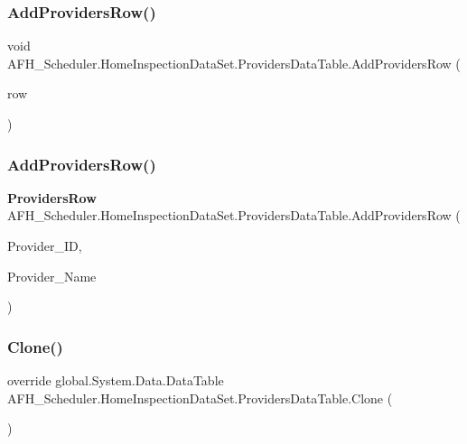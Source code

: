 \subsubsection{AddProvidersRow()\hspace{0.1cm}{\footnotesize\ttfamily [1/2]}}
{\footnotesize\ttfamily void A\+F\+H\+\_\+\+Scheduler.\+Home\+Inspection\+Data\+Set.\+Providers\+Data\+Table.\+Add\+Providers\+Row (\begin{DoxyParamCaption}\item[{\textbf{ Providers\+Row}}]{row }\end{DoxyParamCaption})}

\mbox{\label{class_a_f_h___scheduler_1_1_home_inspection_data_set_1_1_providers_data_table_a434232b72d04fd4749c06f7ab0a6a8bf}} 
\subsubsection{AddProvidersRow()\hspace{0.1cm}{\footnotesize\ttfamily [2/2]}}
{\footnotesize\ttfamily \textbf{ Providers\+Row} A\+F\+H\+\_\+\+Scheduler.\+Home\+Inspection\+Data\+Set.\+Providers\+Data\+Table.\+Add\+Providers\+Row (\begin{DoxyParamCaption}\item[{long}]{Provider\+\_\+\+ID,  }\item[{string}]{Provider\+\_\+\+Name }\end{DoxyParamCaption})}

\mbox{\label{class_a_f_h___scheduler_1_1_home_inspection_data_set_1_1_providers_data_table_a9a9d4255d0305a641366a3c10ba54c80}} 
\subsubsection{Clone()}
{\footnotesize\ttfamily override global.\+System.\+Data.\+Data\+Table A\+F\+H\+\_\+\+Scheduler.\+Home\+Inspection\+Data\+Set.\+Providers\+Data\+Table.\+Clone (\begin{DoxyParamCaption}{ }\end{DoxyParamCaption})}

